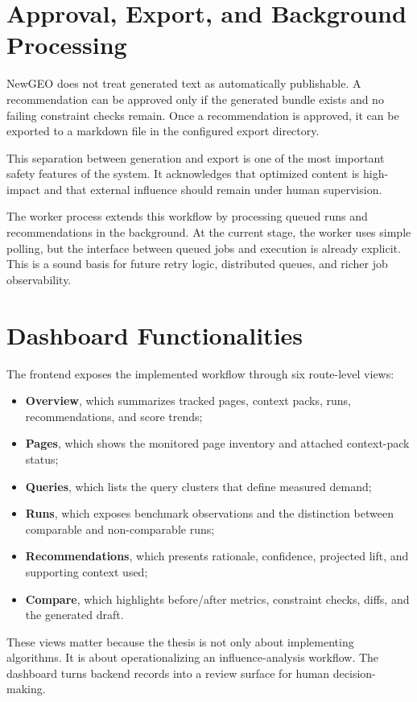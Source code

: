 \section{Approval, Export, and Background Processing}

NewGEO does not treat generated text as automatically publishable. A recommendation can be
approved only if the generated bundle exists and no failing constraint checks remain. Once a
recommendation is approved, it can be exported to a markdown file in the configured export
directory.

This separation between generation and export is one of the most important safety features of
the system. It acknowledges that optimized content is high-impact and that external influence
should remain under human supervision.

The worker process extends this workflow by processing queued runs and recommendations in
the background. At the current stage, the worker uses simple polling, but the interface between
queued jobs and execution is already explicit. This is a sound basis for future retry logic,
distributed queues, and richer job observability.

\section{Dashboard Functionalities}

The frontend exposes the implemented workflow through six route-level views:
\begin{itemize}
    \item \textbf{Overview}, which summarizes tracked pages, context packs, runs, recommendations, and score trends;
    \item \textbf{Pages}, which shows the monitored page inventory and attached context-pack status;
    \item \textbf{Queries}, which lists the query clusters that define measured demand;
    \item \textbf{Runs}, which exposes benchmark observations and the distinction between comparable and non-comparable runs;
    \item \textbf{Recommendations}, which presents rationale, confidence, projected lift, and supporting context used;
    \item \textbf{Compare}, which highlights before/after metrics, constraint checks, diffs, and the generated draft.
\end{itemize}

These views matter because the thesis is not only about implementing algorithms. It is about
operationalizing an influence-analysis workflow. The dashboard turns backend records into a
review surface for human decision-making.

